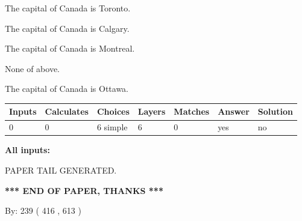 \documentclass[12pt]{article}
\begin{document}
 
The capital of Canada is Toronto.
 
 
The capital of Canada is Calgary.
 
 
The capital of Canada is Montreal.
 
 
 None of above.
 
 
\noindent{}
 
 
The capital of Canada is Ottawa.
 
 
\noindent{}
 
 
   
   
   
   
\noindent\begin{tabular}{|l|l|l|l|l|l|l|}
 \hline
Inputs & Calculates & Choices & Layers & Matches & Answer & Solution \\ \hline
 0  & 
 0  & 
 6
  simple  
  & 
 6  & 
 0  & 
  yes & 
  no 
  \\ \hline
 \end{tabular}
   
   
   
   
\noindent{}
   
   
   
   
\noindent\vspace{0.1in}\hspace{-0.08in} {\textbf{\Large{All inputs: }}}
   
   
   
   
   
   
 \vspace{0.2in}
 
   
   
\vspace{2.0in} PAPER TAIL GENERATED.
   
   
   
   
\vspace{1.0in} 
{\textbf{\large{ *** END OF PAPER, THANKS *** }}} 
   
   
\hspace{1.0in} By: 
 239 ( 416 ,  613 )
   
   
   
   
\newpage 
\setcounter{page}{ 
   523001 } 
   
\end{document}

